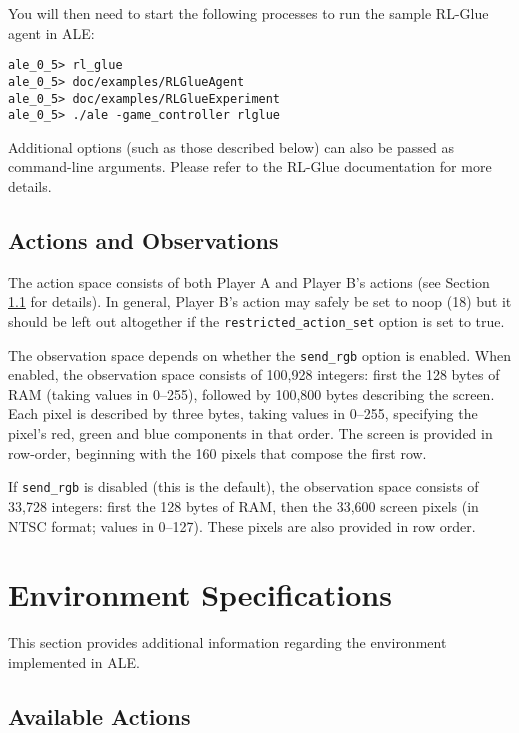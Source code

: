 \documentclass[12pt]{article}
\begin{document}
You will then need to start the following processes to run the sample RL-Glue agent in ALE:

\begin{verbatim}
ale_0_5> rl_glue
ale_0_5> doc/examples/RLGlueAgent
ale_0_5> doc/examples/RLGlueExperiment
ale_0_5> ./ale -game_controller rlglue
\end{verbatim}

Additional options (such as those described below) can also be passed as command-line arguments.
Please refer to the RL-Glue documentation for more details. 


\subsection{Actions and Observations}

The action space consists of both Player A and Player B's actions (see Section 
\ref{sec:available_actions}
for details). In general, Player B's action may safely be set to noop (18) but it should be left out
altogether if the \verb+restricted_action_set+ option is set to true. 

The observation space depends on whether the \verb+send_rgb+ option is enabled. 
 When enabled, the observation space consists of 100,928 
 integers: first the 128 bytes of RAM (taking values in 0--255), followed by 100,800 bytes 
 describing the screen.
 Each pixel is described by three bytes, taking values in 0--255, specifying the pixel's 
 red, green and blue components in that order. The screen is provided in row-order, 
beginning with the 160 pixels that compose the first row.
 
If \verb+send_rgb+ is disabled (this is the default), the observation space consists of 33,728 integers: first the 128 bytes of RAM, then the 33,600 screen pixels (in NTSC format; values in 0--127).
These pixels are also provided in row order.

\section{Environment Specifications}\label{sec:environment_specifications}

This section provides additional information regarding the environment implemented in ALE.

\subsection{Available Actions}\label{sec:available_actions}
\end{document}
